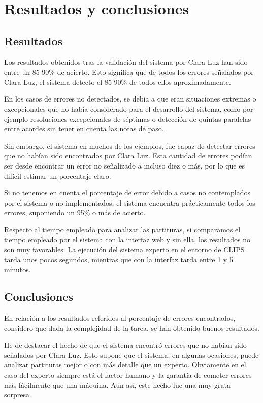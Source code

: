 \chapter{Resultados y conclusiones}

\section{Resultados}

Los resultados obtenidos tras la validación del sistema por Clara Luz han sido entre un 85-90\% de acierto. Esto significa que de todos los errores señalados por Clara Luz, el sistema detecto el 85-90\% de todos ellos aproximadamente.

En los casos de errores no detectados, se debía a que eran situaciones extremas o excepcionales que no había considerado para el desarrollo del sistema, como por ejemplo resoluciones excepcionales de séptimas o detección de quintas paralelas entre acordes sin tener en cuenta las notas de paso. 

Sin embargo, el sistema en muchos de los ejemplos, fue capaz de detectar errores que no habían sido encontrados por Clara Luz. Esta cantidad de errores podían ser desde encontrar un error no señalizado a incluso diez o más, por lo que es difícil estimar un porcentaje claro.

Si no tenemos en cuenta el porcentaje de error debido a casos no contemplados por el sistema o no implementados, el sistema encuentra prácticamente todos los errores, suponiendo un 95\% o más de acierto.

\bigskip

Respecto al tiempo empleado para analizar las partituras, si comparamos el tiempo empleado por el sistema con la interfaz web y sin ella, los resultados no son muy favorables. La ejecución del sistema experto en el entorno de CLIPS tarda unos pocos segundos, mientras que con la interfaz tarda entre 1 y 5 minutos. 

\section{Conclusiones}

En relación a los resultados referidos al porcentaje de errores encontrados, considero que dada la complejidad de la tarea, se han obtenido buenos resultados. 

He de destacar el hecho de que el sistema encontró errores que no habían sido señalados por Clara Luz. Esto supone que el sistema, en algunas ocasiones, puede analizar partituras mejor o con más detalle que un experto. Obviamente en el caso del experto siempre está el factor humano y la garantía de cometer errores más fácilmente que una máquina. Aún así, este hecho fue una muy grata sorpresa.

